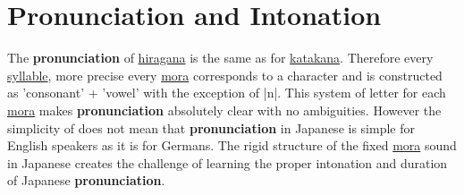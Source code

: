 \section{Pronunciation and Intonation}
\label{sec:PronunciationAndIntonation}
\label{sec:Pronuciation}
\label{sec:Intonation}

The \textbf{pronunciation} of \hyperref[sec:Hiragana]{hiragana} is the same as
for \hyperref[sec:Katakana]{katakana}. Therefore every
\hyperref[sec:Syllable]{syllable}, more precise every \hyperref[sec:Mora]{mora}
corresponds to a \hyperref[sec:\jscript]{\jtopic} character and is constructed
as 'consonant' + 'vowel' with the exception of |n|. This system of letter for
each \hyperref[sec:Mora]{mora} makes \textbf{pronunciation} absolutely clear
with no ambiguities. However the simplicity of \hyperref[sec:\jscript]{\jtopic}
does not mean that \textbf{pronunciation} in Japanese is simple for English
speakers as it is for Germans. The rigid structure of the fixed
\hyperref[sec:Mora]{mora} sound in Japanese creates the challenge of learning
the proper intonation and duration of Japanese \textbf{pronunciation}.

